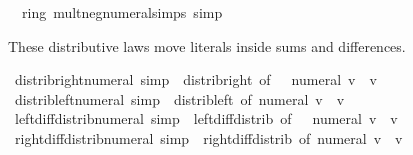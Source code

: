 \begin{isabellebody}
\isamarkupfalse%
\ {\isacharparenleft}{\kern0pt}\ ring{\isacharunderscore}{\kern0pt}{}{\isacharparenright}{\kern0pt}\ mult{\isacharunderscore}{\kern0pt}neg{\isacharunderscore}{\kern0pt}numeral{\isacharunderscore}{\kern0pt}simps\ {\isacharbrackleft}{\kern0pt}simp{\isacharbrackright}{\kern0pt}%
\isadelimdocument
%
\endisadelimdocument
%
\isatagdocument
%
\isamarkuptrue%
%
\endisatagdocument
{\isafolddocument}%
%
\isadelimdocument
%
\endisadelimdocument
%
\begin{isamarkuptext}%
These distributive laws move literals inside sums and differences.%
\end{isamarkuptext}\isamarkuptrue%
\isamarkupfalse%
\ distrib{\isacharunderscore}{\kern0pt}right{\isacharunderscore}{\kern0pt}numeral\ {\isacharbrackleft}{\kern0pt}simp{\isacharbrackright}{\kern0pt}\ {\isacharequal}{\kern0pt}\ distrib{\isacharunderscore}{\kern0pt}right\ {\isacharbrackleft}{\kern0pt}of\ {\isacharunderscore}{\kern0pt}\ {\isacharunderscore}{\kern0pt}\ {\isachardoublequoteopen}numeral\ v{\isachardoublequoteclose}{\isacharbrackright}{\kern0pt}\ \ v\isanewline
{}\isamarkupfalse%
\ distrib{\isacharunderscore}{\kern0pt}left{\isacharunderscore}{\kern0pt}numeral\ {\isacharbrackleft}{\kern0pt}simp{\isacharbrackright}{\kern0pt}\ {\isacharequal}{\kern0pt}\ distrib{\isacharunderscore}{\kern0pt}left\ {\isacharbrackleft}{\kern0pt}of\ {\isachardoublequoteopen}numeral\ v{\isachardoublequoteclose}{\isacharbrackright}{\kern0pt}\ \ v\isanewline
{}\isamarkupfalse%
\ left{\isacharunderscore}{\kern0pt}diff{\isacharunderscore}{\kern0pt}distrib{\isacharunderscore}{\kern0pt}numeral\ {\isacharbrackleft}{\kern0pt}simp{\isacharbrackright}{\kern0pt}\ {\isacharequal}{\kern0pt}\ left{\isacharunderscore}{\kern0pt}diff{\isacharunderscore}{\kern0pt}distrib\ {\isacharbrackleft}{\kern0pt}of\ {\isacharunderscore}{\kern0pt}\ {\isacharunderscore}{\kern0pt}\ {\isachardoublequoteopen}numeral\ v{\isachardoublequoteclose}{\isacharbrackright}{\kern0pt}\ \ v\isanewline
{}\isamarkupfalse%
\ right{\isacharunderscore}{\kern0pt}diff{\isacharunderscore}{\kern0pt}distrib{\isacharunderscore}{\kern0pt}numeral\ {\isacharbrackleft}{\kern0pt}simp{\isacharbrackright}{\kern0pt}\ {\isacharequal}{\kern0pt}\ right{\isacharunderscore}{\kern0pt}diff{\isacharunderscore}{\kern0pt}distrib\ {\isacharbrackleft}{\kern0pt}of\ {\isachardoublequoteopen}numeral\ v{\isachardoublequoteclose}{\isacharbrackright}{\kern0pt}\ \ v%

\end{isabellebody}
